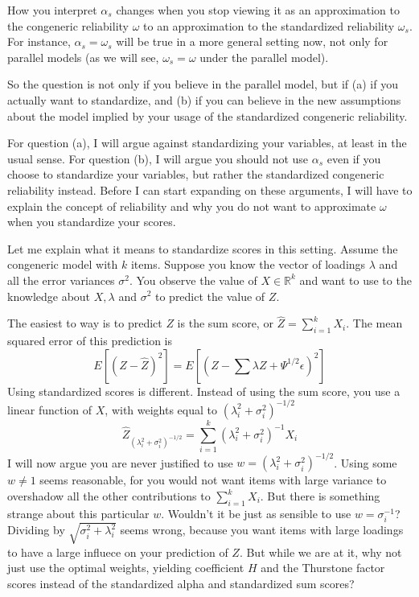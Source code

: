 \documentclass{article}
\theoremstyle{plain}
\theoremstyle{plain}
\theoremstyle{definition}
\theoremstyle{remark}
\theoremstyle{definition}
\theoremstyle{plain}
\theoremstyle{plain}
\theoremstyle{definition}
\begin{document}
How you interpret $\alpha_{s}$ changes when you stop viewing it as
an approximation to the congeneric reliability $\omega$ to an approximation
to the standardized reliability $\omega_{s}$. For instance, $\alpha_{s}=\omega_{s}$
will be true in a more general setting now, not only for parallel
models (as we will see, $\omega_{s}=\omega$ under the parallel model).

So the question is not only if you believe in the parallel model,
but if (a) if you actually want to standardize, and (b) if you can
believe in the new assumptions about the model implied by your usage
of the standardized congeneric reliability. 

For question (a), I will argue against standardizing your variables,
at least in the usual sense. For question (b), I will argue you should
not use $\alpha_{s}$ even if you choose to standardize your variables,
but rather the standardized congeneric reliability instead. Before
I can start expanding on these arguments, I will have to explain the
concept of reliability and why you do not want to approximate $\omega$
when you standardize your scores.

Let me explain what it means to standardize scores in this setting.
Assume the congeneric model with $k$ items. Suppose you know the
vector of loadings $\lambda$ and all the error variances $\sigma^{2}$.
You observe the value of $X\in\mathbb{R}^{k}$ and want to use to
the knowledge about $X,\lambda$ and $\sigma^{2}$ to predict the
value of $Z$.

The easiest to way is to predict $Z$ is the sum score, or $\widehat{Z}=\sum_{i=1}^{k}X_{i}$.
The mean squared error of this prediction is
\[
E\left[\left(Z-\widehat{Z}\right)^{2}\right]=E\left[\left(Z-\sum\lambda Z+\Psi^{1/2}\epsilon\right)^{2}\right]
\]
Using standardized scores is different. Instead of using the sum score,
you use a linear function of $X$, with weights equal to $(\lambda_{i}^{2}+\sigma_{i}^{2})^{-1/2}$
\[
\widehat{Z}_{(\lambda_{i}^{2}+\sigma_{i}^{2})^{-1/2}}=\sum_{i=1}^{k}(\lambda_{i}^{2}+\sigma_{i}^{2})^{-1}X_{i}
\]
I will now argue you are never justified to use $w=(\lambda_{i}^{2}+\sigma_{i}^{2})^{-1/2}$.
Using some $w\ne1$ seems reasonable, for you would not want items
with large variance to overshadow all the other contributions to $\sum_{i=1}^{k}X_{i}$.
But there is something strange about this particular $w$. Wouldn't
it be just as sensible to use $w=\sigma_{i}^{-1}$? Dividing by $\sqrt{\sigma_{i}^{2}+\lambda_{i}^{2}}$
seems wrong, because you want items with large loadings to have a
large influece on your prediction of $Z$. But while we are at it,
why not just use the optimal weights, yielding coefficient $H$ and
the Thurstone factor scores instead of the standardized alpha and
standardized sum scores?
\end{document}
